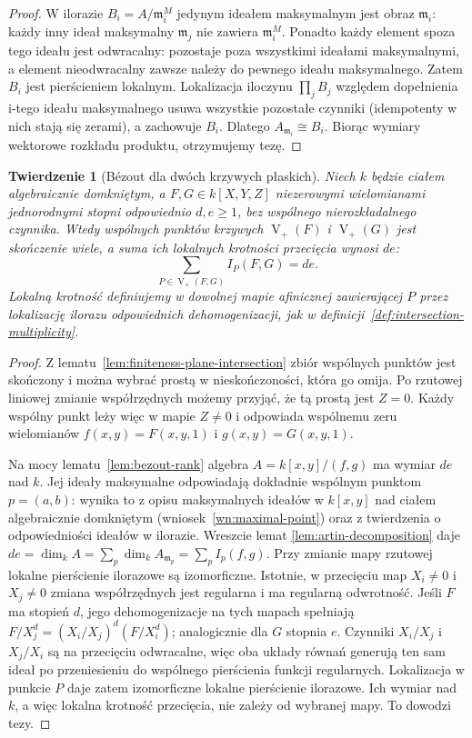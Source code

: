 \documentclass[11pt,a4paper,openany]{report}
\numberwithin{equation}{section}
\theoremstyle{plain}
\newtheorem{twierdzenie}{Twierdzenie}[section]
\theoremstyle{definition}
\theoremstyle{remark}
\newcommand{\V}{\operatorname V}
\begin{document}
\begin{proof}
W ilorazie $B_i=A/\mathfrak m_i^M$ jedynym ideałem maksymalnym
jest obraz $\mathfrak m_i$: każdy inny ideał maksymalny
$\mathfrak m_j$ nie zawiera $\mathfrak m_i^M$.
Ponadto każdy element spoza tego ideału jest odwracalny:
pozostaje poza wszystkimi ideałami maksymalnymi, a element
nieodwracalny zawsze należy do pewnego ideału maksymalnego.
Zatem $B_i$ jest pierścieniem lokalnym.
Lokalizacja iloczynu $\prod_j B_j$ względem dopełnienia
i-tego ideału maksymalnego usuwa wszystkie pozostałe czynniki
(idempotenty w nich stają się zerami), a zachowuje $B_i$.
Dlatego $A_{\mathfrak m_i}\cong B_i$. Biorąc wymiary
wektorowe rozkładu produktu, otrzymujemy tezę.
\end{proof}

\begin{twierdzenie}[Bézout dla dwóch krzywych płaskich]
\label{tw:bezout-general}
Niech $k$ będzie ciałem algebraicznie domkniętym,
a $F,G\in k[X,Y,Z]$ niezerowymi wielomianami jednorodnymi
stopni odpowiednio $d,e\ge1$, bez wspólnego
nierozkładalnego czynnika. Wtedy wspólnych punktów
krzywych $\V_+(F)$ i $\V_+(G)$ jest skończenie wiele,
a suma ich lokalnych krotności przecięcia wynosi $de$:
\[
 \sum_{P\in\V_+(F,G)} I_P(F,G)=de.
\]
Lokalną krotność definiujemy w dowolnej mapie afinicznej
zawierającej $P$ przez lokalizację ilorazu odpowiednich
dehomogenizacji, jak w definicji~\ref{def:intersection-multiplicity}.
\end{twierdzenie}
\begin{proof}
Z lematu~\ref{lem:finiteness-plane-intersection} zbiór
wspólnych punktów jest skończony i można wybrać prostą
w nieskończoności, która go omija. Po rzutowej liniowej
zmianie współrzędnych możemy przyjąć, że tą prostą
jest $Z=0$. Każdy wspólny punkt leży więc w mapie
$Z\ne0$ i odpowiada wspólnemu zeru wielomianów
$f(x,y)=F(x,y,1)$ i $g(x,y)=G(x,y,1)$.

Na mocy lematu~\ref{lem:bezout-rank} algebra
$A=k[x,y]/(f,g)$ ma wymiar $de$ nad $k$.
Jej ideały maksymalne odpowiadają dokładnie wspólnym
punktom $p=(a,b)$: wynika to z opisu maksymalnych ideałów
w $k[x,y]$ nad ciałem algebraicznie domkniętym
(wniosek~\ref{wn:maximal-point}) oraz z twierdzenia
o odpowiedniości ideałów w ilorazie. Wreszcie lemat
\ref{lem:artin-decomposition} daje
$de=\dim_k A=\sum_{p}\dim_k A_{\mathfrak m_p}
=\sum_p I_p(f,g)$. Przy zmianie mapy rzutowej
lokalne pierścienie ilorazowe są izomorficzne.
Istotnie, w przecięciu map $X_i\ne0$ i $X_j\ne0$
zmiana współrzędnych jest regularna i ma regularną odwrotność.
Jeśli $F$ ma stopień $d$, jego dehomogenizacje na tych
mapach spełniają $F/X_j^d=(X_i/X_j)^d(F/X_i^d)$;
analogicznie dla $G$ stopnia $e$. Czynniki $X_i/X_j$
i $X_j/X_i$ są na przecięciu odwracalne, więc
oba układy równań generują ten sam ideał po
przeniesieniu do wspólnego pierścienia funkcji
regularnych. Lokalizacja w punkcie $P$ daje zatem
izomorficzne lokalne pierścienie ilorazowe.
Ich wymiar nad $k$, a więc lokalna krotność przecięcia,
nie zależy od wybranej mapy. To dowodzi tezy.
\end{proof}
\end{document}
